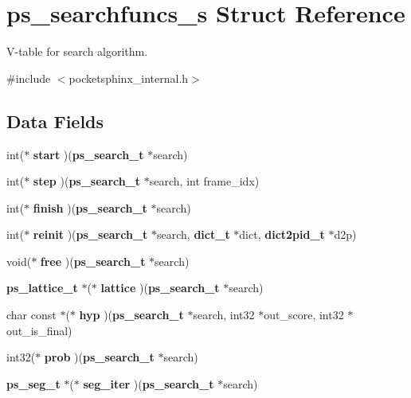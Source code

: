 \section{ps\-\_\-searchfuncs\-\_\-s Struct Reference}
\label{structps__searchfuncs__s}


V-\/table for search algorithm.  




{\ttfamily \#include $<$pocketsphinx\-\_\-internal.\-h$>$}

\subsection*{Data Fields}
\begin{DoxyCompactItemize}
\item 
int($\ast$ {\bfseries start} )({\bf ps\-\_\-search\-\_\-t} $\ast$search)\label{structps__searchfuncs__s_a74ab853abe9f12ce016c5e92e10f0fe2}

\item 
int($\ast$ {\bfseries step} )({\bf ps\-\_\-search\-\_\-t} $\ast$search, int frame\-\_\-idx)\label{structps__searchfuncs__s_a7c92cba8683e766c1d4988118fc883f7}

\item 
int($\ast$ {\bfseries finish} )({\bf ps\-\_\-search\-\_\-t} $\ast$search)\label{structps__searchfuncs__s_a20a8de3b54011ce526e1a80ad42bb7c4}

\item 
int($\ast$ {\bfseries reinit} )({\bf ps\-\_\-search\-\_\-t} $\ast$search, {\bf dict\-\_\-t} $\ast$dict, {\bf dict2pid\-\_\-t} $\ast$d2p)\label{structps__searchfuncs__s_ac72f755ca7e66ee559a117982cf1a374}

\item 
void($\ast$ {\bfseries free} )({\bf ps\-\_\-search\-\_\-t} $\ast$search)\label{structps__searchfuncs__s_ad1f76bab9eede4b2fd1dd0e65bd6c60b}

\item 
{\bf ps\-\_\-lattice\-\_\-t} $\ast$($\ast$ {\bfseries lattice} )({\bf ps\-\_\-search\-\_\-t} $\ast$search)\label{structps__searchfuncs__s_aeaeebdd2e5852aef04a25eb2291139e1}

\item 
char const $\ast$($\ast$ {\bfseries hyp} )({\bf ps\-\_\-search\-\_\-t} $\ast$search, int32 $\ast$out\-\_\-score, int32 $\ast$out\-\_\-is\-\_\-final)\label{structps__searchfuncs__s_ab35d758b994ad40cc693d1015552c3a2}

\item 
int32($\ast$ {\bfseries prob} )({\bf ps\-\_\-search\-\_\-t} $\ast$search)\label{structps__searchfuncs__s_abf94b8e4523c3f3c39fde4454f78fe16}

\item 
{\bf ps\-\_\-seg\-\_\-t} $\ast$($\ast$ {\bfseries seg\-\_\-iter} )({\bf ps\-\_\-search\-\_\-t} $\ast$search)\label{structps__searchfuncs__s_a5e1b58e9370c2e18c6805fb9e40a8007}

\end{DoxyCompactItemize}


